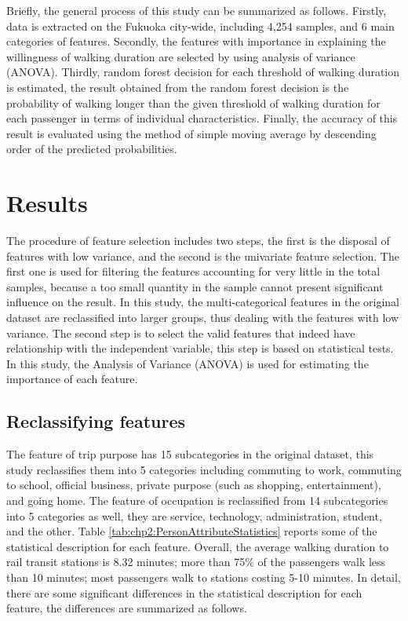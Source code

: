 %
Briefly, the general process of this study can be summarized as follows. Firstly, data is extracted on the Fukuoka city-wide, including 4,254 samples, and 6 main categories of features. Secondly, the features with importance in explaining the willingness of walking duration are selected by using analysis of variance (ANOVA). Thirdly, random forest decision for each threshold of walking duration is estimated, the result obtained from the random forest decision is the probability of walking longer than the given threshold of walking duration for each passenger in terms of individual characteristics. Finally, the accuracy of this result is evaluated using the method of simple moving average by descending order of the predicted probabilities.

%
\section{Results}
The procedure of feature selection includes two steps, the first is the disposal of features with low variance, and the second is the univariate feature selection. The first one is used for filtering the features accounting for very little in the total samples, because a too small quantity in the sample cannot present significant influence on the result. In this study, the multi-categorical features in the original dataset are reclassified into larger groups, thus dealing with the features with low variance. The second step is to select the valid features that indeed have relationship with the independent variable, this step is based on statistical tests. In this study, the Analysis of Variance (ANOVA) is used for estimating the importance of each feature.

%
\subsection{Reclassifying features}
The feature of trip purpose has 15 subcategories in the original dataset, this study reclassifies them into 5 categories including commuting to work, commuting to school, official business, private purpose (such as shopping, entertainment), and going home. The feature of occupation is reclassified from 14 subcategories into 5 categories as well, they are service, technology, administration, student, and the other. Table \ref{tab:chp2:PersonAttributeStatistics} reports some of the statistical description for each feature. Overall, the average walking duration to rail transit stations is 8.32 minutes; more than 75\% of the passengers walk less than 10 minutes; most passengers walk to stations costing 5-10 minutes. In detail, there are some significant differences in the statistical description for each feature, the differences are summarized as follows.

